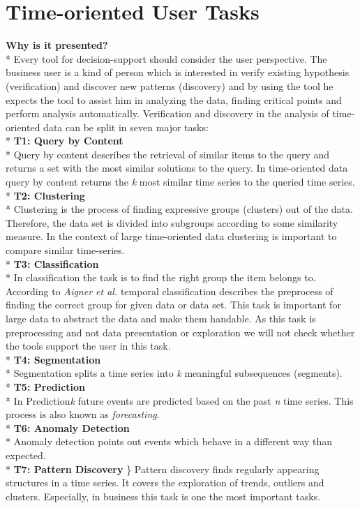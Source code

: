 \section{Time-oriented User Tasks} \label{tasks}
\textbf{Why is it presented?}\\*
Every tool for decision-support should consider the user perspective. The business user is a kind of person which is interested in verify existing hypothesis (verification) and discover new patterns (discovery) and by using the tool he expects the tool to assist him in analyzing the data, finding critical points and perform analysis automatically\cite{Brachman1996}. Verification and discovery in the analysis of time-oriented data can be split in seven major tasks\cite{Esling2012}:\\*
\textbf{T1: Query by Content}
\\*
Query by content describes the retrieval of similar items to the query and returns a set with the most similar solutions to the query. In time-oriented data query by content returns the \textit{k} most similar time series to the queried time series.
\\*
\textbf{T2: Clustering}\\*
Clustering is the process of finding expressive groups (clusters) out of the data. Therefore, the data set is divided into subgroups according to some similarity measure. In the context of large time-oriented data clustering is important to compare similar time-series.
\\*
\textbf{T3: Classification}\\*
In classification the task is to find the right group the item belongs to. According to \textit{Aigner et al.} temporal classification describes the preprocess of finding the correct group for given data or data set. This task is important for large data to abstract the data and make them handable. As this task is preprocessing and not data presentation or exploration we will not check whether the tools support the user in this task. 
\\*
\textbf{T4: Segmentation}\\*
Segmentation splits a time series into \textit{k} meaningful subsequences (segments)\cite{batyrshin2007perception}. 
\\*
\textbf{T5: Prediction}\\*
In Prediction\textit{k} future events are predicted based on the past \textit{n} time series. This process is also known as \textit{forecasting}. 
\\*
\textbf{T6: Anomaly Detection} \\*
Anomaly detection points out events which behave in a different way than expected.
\\*
\textbf{T7: Pattern Discovery} \}\*
Pattern discovery finds regularly appearing structures in a time series.  It covers the exploration of trends, outliers and clusters. Especially, in business this task is one the most important tasks.


